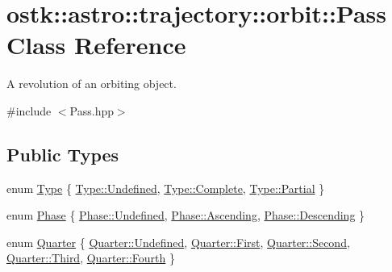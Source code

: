 \hypertarget{classostk_1_1astro_1_1trajectory_1_1orbit_1_1_pass}{}\section{ostk\+:\+:astro\+:\+:trajectory\+:\+:orbit\+:\+:Pass Class Reference}
\label{classostk_1_1astro_1_1trajectory_1_1orbit_1_1_pass}


A revolution of an orbiting object.  




{\ttfamily \#include $<$Pass.\+hpp$>$}

\subsection*{Public Types}
\begin{DoxyCompactItemize}
\item 
enum \hyperlink{classostk_1_1astro_1_1trajectory_1_1orbit_1_1_pass_a74449dbd104c6a24462b373cc55febcc}{Type} \{ \hyperlink{classostk_1_1astro_1_1trajectory_1_1orbit_1_1_pass_a74449dbd104c6a24462b373cc55febccaec0fc0100c4fc1ce4eea230c3dc10360}{Type\+::\+Undefined}, 
\hyperlink{classostk_1_1astro_1_1trajectory_1_1orbit_1_1_pass_a74449dbd104c6a24462b373cc55febccaae94f80b3ce82062a5dd7815daa04f9d}{Type\+::\+Complete}, 
\hyperlink{classostk_1_1astro_1_1trajectory_1_1orbit_1_1_pass_a74449dbd104c6a24462b373cc55febcca44ffd38a6dea695cbe2b34efdcc6cf27}{Type\+::\+Partial}
 \}
\item 
enum \hyperlink{classostk_1_1astro_1_1trajectory_1_1orbit_1_1_pass_a9fb48e13f29c899a8b74c43091fe4203}{Phase} \{ \hyperlink{classostk_1_1astro_1_1trajectory_1_1orbit_1_1_pass_a9fb48e13f29c899a8b74c43091fe4203aec0fc0100c4fc1ce4eea230c3dc10360}{Phase\+::\+Undefined}, 
\hyperlink{classostk_1_1astro_1_1trajectory_1_1orbit_1_1_pass_a9fb48e13f29c899a8b74c43091fe4203acf3fb1ff52ea1eed3347ac5401ee7f0c}{Phase\+::\+Ascending}, 
\hyperlink{classostk_1_1astro_1_1trajectory_1_1orbit_1_1_pass_a9fb48e13f29c899a8b74c43091fe4203ae3cf5ac19407b1a62c6fccaff675a53b}{Phase\+::\+Descending}
 \}
\item 
enum \hyperlink{classostk_1_1astro_1_1trajectory_1_1orbit_1_1_pass_a4c5f54feec066a636b1e7293aacf0114}{Quarter} \{ \newline
\hyperlink{classostk_1_1astro_1_1trajectory_1_1orbit_1_1_pass_a4c5f54feec066a636b1e7293aacf0114aec0fc0100c4fc1ce4eea230c3dc10360}{Quarter\+::\+Undefined}, 
\hyperlink{classostk_1_1astro_1_1trajectory_1_1orbit_1_1_pass_a4c5f54feec066a636b1e7293aacf0114a7fb55ed0b7a30342ba6da306428cae04}{Quarter\+::\+First}, 
\hyperlink{classostk_1_1astro_1_1trajectory_1_1orbit_1_1_pass_a4c5f54feec066a636b1e7293aacf0114ac22cf8376b1893dcfcef0649fe1a7d87}{Quarter\+::\+Second}, 
\hyperlink{classostk_1_1astro_1_1trajectory_1_1orbit_1_1_pass_a4c5f54feec066a636b1e7293aacf0114a168909c0b6f1dfbd48f679d47059c1d6}{Quarter\+::\+Third}, 
\newline
\hyperlink{classostk_1_1astro_1_1trajectory_1_1orbit_1_1_pass_a4c5f54feec066a636b1e7293aacf0114a6e599f7a2a9186d391be4537f105be98}{Quarter\+::\+Fourth}
 \}
\end{DoxyCompactItemize}
